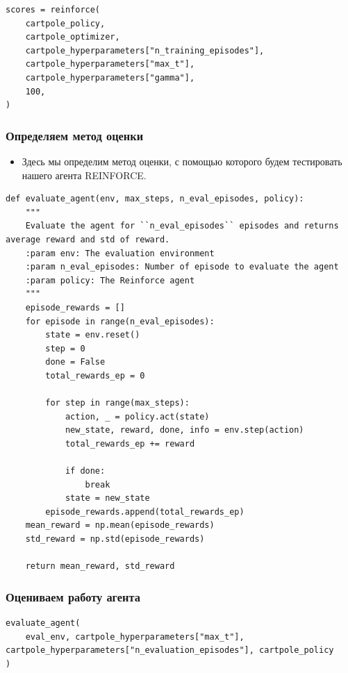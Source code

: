 \documentclass[11pt,a4paper]{article}
\begin{document}
\begin{lstlisting}
scores = reinforce(
    cartpole_policy,
    cartpole_optimizer,
    cartpole_hyperparameters["n_training_episodes"],
    cartpole_hyperparameters["max_t"],
    cartpole_hyperparameters["gamma"],
    100,
)
\end{lstlisting}

\subsubsection{Определяем метод оценки}\label{define-evaluation-method}

\begin{itemize}
\tightlist
\item
  Здесь мы определим метод оценки, с помощью которого будем тестировать нашего агента REINFORCE.
\end{itemize}

\begin{lstlisting}
def evaluate_agent(env, max_steps, n_eval_episodes, policy):
    """
    Evaluate the agent for ``n_eval_episodes`` episodes and returns average reward and std of reward.
    :param env: The evaluation environment
    :param n_eval_episodes: Number of episode to evaluate the agent
    :param policy: The Reinforce agent
    """
    episode_rewards = []
    for episode in range(n_eval_episodes):
        state = env.reset()
        step = 0
        done = False
        total_rewards_ep = 0

        for step in range(max_steps):
            action, _ = policy.act(state)
            new_state, reward, done, info = env.step(action)
            total_rewards_ep += reward

            if done:
                break
            state = new_state
        episode_rewards.append(total_rewards_ep)
    mean_reward = np.mean(episode_rewards)
    std_reward = np.std(episode_rewards)

    return mean_reward, std_reward
\end{lstlisting}

\subsubsection{Оцениваем работу агента}\label{evaluate-our-agent}

\begin{lstlisting}
evaluate_agent(
    eval_env, cartpole_hyperparameters["max_t"], cartpole_hyperparameters["n_evaluation_episodes"], cartpole_policy
)
\end{lstlisting}
\end{document}
